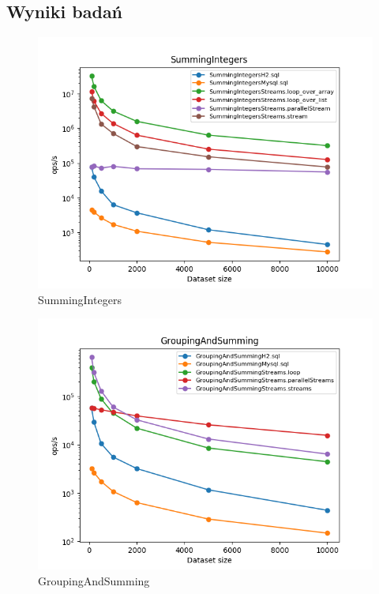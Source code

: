 \documentclass[12pt]{extarticle}
\begin{document}
\subsection{Wyniki badań}


\begin{figure}[H]
\centering
\includegraphics[width=15cm]{plots/SummingIntegers}
\caption{SummingIntegers}
\end{figure}

\begin{figure}[H]
\centering
\includegraphics[width=15cm]{plots/GroupingAndSumming}
\caption{GroupingAndSumming}
\end{figure}
\end{document}
